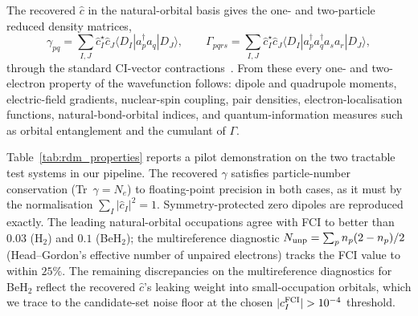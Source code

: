 \documentclass[journal=jctcce,manuscript=suppinfo,layout=traditional]{achemso}
\begin{document}
The recovered $\widehat{c}$ in the natural-orbital basis gives the
one- and two-particle reduced density matrices,
\begin{equation}
\gamma_{pq} = \sum_{I,J} \widehat{c}_I^{\star} \widehat{c}_J
              \langle D_I | a_p^{\dagger} a_q | D_J \rangle,
\qquad
\Gamma_{pqrs} = \sum_{I,J} \widehat{c}_I^{\star} \widehat{c}_J
              \langle D_I | a_p^{\dagger} a_q^{\dagger} a_s a_r | D_J \rangle,
\label{eq:rdms}
\end{equation}
through the standard CI-vector
contractions~\cite{Helgaker2000MEST}. From these every one- and
two-electron property of the wavefunction follows: dipole and
quadrupole moments,
electric-field gradients, nuclear-spin coupling, pair densities,
electron-localisation functions, natural-bond-orbital indices, and
quantum-information measures such as orbital entanglement and the
cumulant of $\Gamma$.

Table~\ref{tab:rdm_properties} reports a pilot demonstration on the
two tractable test systems in our pipeline. The recovered $\gamma$
satisfies particle-number conservation (Tr~$\gamma = N_e$) to
floating-point precision in both cases, as it must by the
normalisation $\sum_I |\widehat{c}_I|^2 = 1$. Symmetry-protected
zero dipoles are reproduced exactly. The leading natural-orbital
occupations agree with FCI to better than $0.03$ (H$_2$) and
$0.1$ (BeH$_2$); the multireference diagnostic
$N_{\rm unp} = \sum_p n_p (2 - n_p)/2$ (Head--Gordon's effective
number of unpaired electrons) tracks the FCI value to within $25\%$.
The remaining discrepancies on the multireference diagnostics for
BeH$_2$ reflect the recovered $\widehat{c}$'s leaking weight into
small-occupation orbitals, which we trace to the candidate-set noise
floor at the chosen $|c_I^{\rm FCI}| > 10^{-4}$ threshold.
\end{document}
